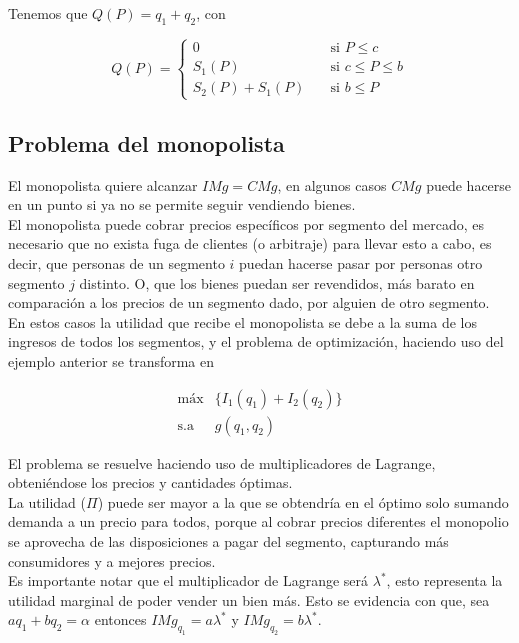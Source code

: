 Tenemos que $Q(P) = q_1 + q_2$, con

\[ Q(P) = 
\begin{cases}
	0 &\quad \text{si } P \leq c\\
	S_1(P) &\quad \text{si } c \leq P \leq b\\
	S_2(P) + S_1(P) &\quad \text{si } b \leq P
\end{cases}
\]

\subsection{Problema del monopolista}

El monopolista quiere alcanzar $IMg = CMg$, en algunos casos $CMg$ puede hacerse  en un punto si ya no se permite seguir vendiendo bienes.\\

El monopolista puede cobrar precios específicos por segmento del mercado, es necesario que no exista fuga de clientes (o arbitraje) para llevar esto a cabo, es decir, que personas de un segmento $i$ puedan hacerse pasar por personas otro segmento $j$ distinto. O, que los bienes puedan ser revendidos, más barato en comparación a los precios de un segmento dado, por alguien de otro segmento.\\

En estos casos la utilidad que recibe el monopolista se debe a la suma de los ingresos de todos los segmentos, y el problema de optimización, haciendo uso del ejemplo anterior se transforma en

\begin{equation}
	\begin{split}
		\text{máx}& \{ I_1(q_1) + I_2(q_2) \}\\
		\text{s.a }& g(q_1,q_2)
	\end{split}
	\nonumber
\end{equation}

El problema se resuelve haciendo uso de multiplicadores de Lagrange, obteniéndose los precios y cantidades óptimas.\\

La utilidad ($\Pi$) puede ser mayor a la que se obtendría en el óptimo solo sumando demanda a un precio para todos, porque al cobrar precios diferentes el monopolio se aprovecha de las disposiciones a pagar del segmento, capturando más consumidores y a mejores precios.\\

Es importante notar que el multiplicador de Lagrange será $\lambda^*$, esto representa la utilidad marginal de poder vender un bien más. Esto se evidencia con que, sea $aq_1 + bq_2 = \alpha$ entonces $IMg_{q_1} = a\lambda^*$ y $IMg_{q_2} = b\lambda^*$.

